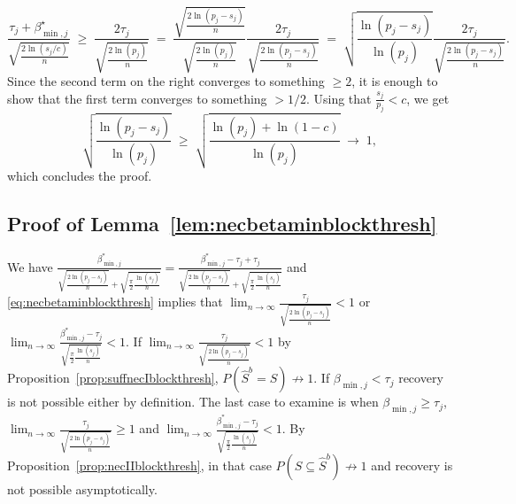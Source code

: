 \documentclass[aos]{imsart}
\theoremstyle{plain}
\begin{document}
$$
\frac{\tau_j+\beta^\star_{\min,j}}{\sqrt{\tfrac{2\ln(s_j/c)}{n}}}\;\geq\;\frac{2\tau_j}{\sqrt{\tfrac{2\ln(p_j)}{n}}}\;=\;\frac{\sqrt{\tfrac{2\ln(p_j-s_j)}{n}}}{\sqrt{\tfrac{2\ln(p_j)}{n}}}\frac{2\tau_j}{\sqrt{\tfrac{2\ln(p_j-s_j)}{n}}}\;=\;\sqrt{\frac{\ln(p_j-s_j)}{\ln(p_j)}}\frac{2\tau_j}{\sqrt{\tfrac{2\ln(p_j-s_j)}{n}}}.
$$
Since the second term on the right converges to something $\geq 2$, it is enough to show that the first term converges to something $>1/2$. Using that $\tfrac{s_j}{p_j}<c$, we get
$$
\sqrt{\frac{\ln(p_j-s_j)}{\ln(p_j)}}\;\geq\;\sqrt{\frac{\ln(p_j)+\ln(1-c)}{\ln(p_j)}}\;\to\;1,
$$
which concludes the proof.

\subsection{Proof of Lemma~\ref{lem:necbetaminblockthresh}}
    We have $\frac{\beta_{\min,j}^*}{\sqrt{\tfrac{2\ln(p_j-s_j)}{n}}+\sqrt{\tfrac{\pi}{2}\tfrac{\ln(s_j)}{n}}}= \frac{\beta_{\min,j}^*-\tau_j+\tau_j}{\sqrt{\tfrac{2\ln(p_j-s_j)}{n}}+\sqrt{\tfrac{\pi}{2}\tfrac{\ln(s_j)}{n}}}$ and \eqref{eq:necbetaminblockthresh} implies that $\lim_{n\to \infty}\frac{\tau_j}{\sqrt{\tfrac{2\ln(p_j-s_j)}{n}}} <1$ or $\lim_{n\to \infty}\frac{\beta_{\min,j}^*-\tau_j}{\sqrt{\tfrac{\pi}{2}\tfrac{\ln(s_j)}{n}}} <1$. 
    If $\lim_{n\to \infty}\frac{\tau_j}{\sqrt{\tfrac{2\ln(p_j-s_j)}{n}}} <1$ by Proposition~\ref{prop:suffnecIblockthresh}, $P(\hat{S}^{b} = S)\not \to 1$. If $\beta_{\min,j}<\tau_j$ recovery is not possible either by definition. 
    The last case to examine is when $\beta_{\min,j}\geq\tau_j$, $\lim_{n\to \infty}\frac{\tau_j}{\sqrt{\tfrac{2\ln(p_j-s_j)}{n}}} \geq 1$ and $\lim_{n\to \infty}\frac{\beta_{\min,j}^*-\tau_j}{\sqrt{\tfrac{\pi}{2}\tfrac{\ln(s_j)}{n}}} <1$. By Proposition~\ref{prop:necIIblockthresh}, in that case $P(S \subseteq \hat{S}^{b} )\not \to 1$ and recovery is not possible asymptotically.
\end{document}

